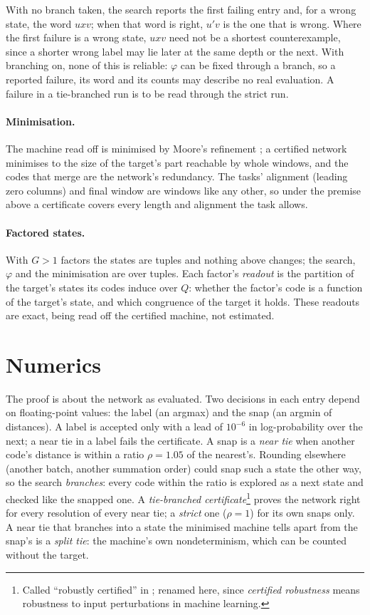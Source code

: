 \documentclass[11pt]{article}
\theoremstyle{definition}
\begin{document}
With no branch taken, the search reports the first failing entry and, for a wrong state, the word $uxv$;
when that word is right, $u'v$ is the one that is wrong. Where the first failure is a wrong state, $uxv$
need not be a shortest counterexample, since a shorter wrong label may lie later at the same depth or the
next. With branching on, none of this is reliable: $\varphi$ can be fixed through a branch, so a reported
failure, its word and its counts may describe no real evaluation. A failure in a tie-branched run is
to be read through the strict run.

\paragraph{Minimisation.} The machine read off is minimised by Moore's refinement
\citep{moore-1956-gedanken-experiments-sequential-machines}; a certified network minimises to the size
of the target's part reachable by whole windows, and the codes that merge are the network's redundancy.
The tasks' alignment (leading zero columns) and final window are windows like any other, so under the
premise above a certificate covers every length and alignment the task allows.

\paragraph{Factored states.} With $G > 1$ factors the states are tuples and nothing above changes;
the search, $\varphi$ and the minimisation are over tuples. Each factor's \emph{readout} is the partition
of the target's states its codes induce over $Q$: whether the factor's code is a function of the
target's state, and which congruence of the target it holds. These readouts are exact, being read
off the certified machine, not estimated.

\section{Numerics}
\label{sec:numerics}

The proof is about the network as evaluated. Two decisions in each entry depend on floating-point
values: the label (an argmax) and the snap (an argmin of distances). A label is accepted only with a
lead of $10^{-6}$ in log-probability over the next; a near tie in a label fails the certificate. A
snap is a \emph{near tie} when another code's distance is within a ratio $\rho = 1.05$ of the nearest's.
Rounding elsewhere (another batch, another summation order) could snap such a state the other way,
so the search \emph{branches}: every code within the ratio is explored as a next state and checked
like the snapped one. A \emph{tie-branched certificate}\footnote{Called ``robustly certified'' in
\citet{barkhuizen-2026-learning-transducers-with-proof}; renamed here, since \emph{certified
robustness} means robustness to input perturbations in machine learning.} proves the network right
for every resolution of every near tie; a \emph{strict} one ($\rho = 1$) for its own snaps only. A
near tie that branches into a state the minimised machine tells apart from the snap's is a
\emph{split tie}: the machine's own nondeterminism, which can be counted without the target.
\end{document}
